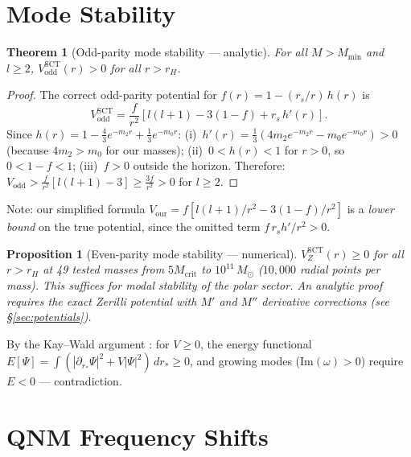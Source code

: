 \documentclass[11pt,a4paper]{article}
\newcommand{\Msun}{M_\odot}
\newcommand{\Mcrit}{M_{\mathrm{crit}}}
\newcommand{\Mmin}{M_{\mathrm{min}}}
\newtheorem{theorem}{Theorem}
\newtheorem{proposition}{Proposition}
\begin{document}
\section{Mode Stability}\label{sec:stability}

\begin{theorem}[Odd-parity mode stability --- analytic]
For all $M > \Mmin$ and $l \geq 2$,
$V_{\mathrm{odd}}^{\mathrm{SCT}}(r) > 0$ for all $r > r_H$.
\end{theorem}

\begin{proof}
The correct odd-parity potential for $f(r) = 1 - (r_s/r)\,h(r)$ is
\begin{equation}
V_{\mathrm{odd}}^{\mathrm{SCT}} = \frac{f}{r^2}\left[l(l+1) - 3(1-f) + r_s\,h'(r)\right].
\end{equation}
Since $h(r) = 1 - \tfrac{4}{3}e^{-m_2 r} + \tfrac{1}{3}e^{-m_0 r}$:
(i)~$h'(r) = \tfrac{1}{3}(4m_2 e^{-m_2 r} - m_0 e^{-m_0 r}) > 0$
(because $4m_2 > m_0$ for our masses);
(ii)~$0 < h(r) < 1$ for $r > 0$, so $0 < 1-f < 1$;
(iii)~$f > 0$ outside the horizon.
Therefore:
$V_{\mathrm{odd}} > \frac{f}{r^2}[l(l+1) - 3] \geq \frac{3f}{r^2} > 0$
for $l \geq 2$.
\end{proof}

Note: our simplified formula $V_{\mathrm{our}} = f[l(l+1)/r^2 - 3(1-f)/r^2]$
is a \emph{lower bound} on the true potential, since the omitted term
$f\,r_s h'/r^2 > 0$.

\begin{proposition}[Even-parity mode stability --- numerical]
$V_Z^{\mathrm{SCT}}(r) \geq 0$ for all $r > r_H$ at 49 tested masses
from $5\Mcrit$ to $10^{11}\,\Msun$ ($10{,}000$ radial points per mass).
This suffices for modal stability of the polar sector.
An analytic proof requires the exact Zerilli potential with
$M'$ and $M''$ derivative corrections (see \S\ref{sec:potentials}).
\end{proposition}

By the Kay--Wald argument \cite{KayWald:1987}: for $V \geq 0$, the energy
functional $E[\Psi] = \int(|\partial_{r_*}\Psi|^2 + V|\Psi|^2)\,dr_* \geq 0$,
and growing modes ($\mathrm{Im}(\omega) > 0$) require $E < 0$ --- contradiction.

\section{QNM Frequency Shifts}\label{sec:shifts}
\end{document}
